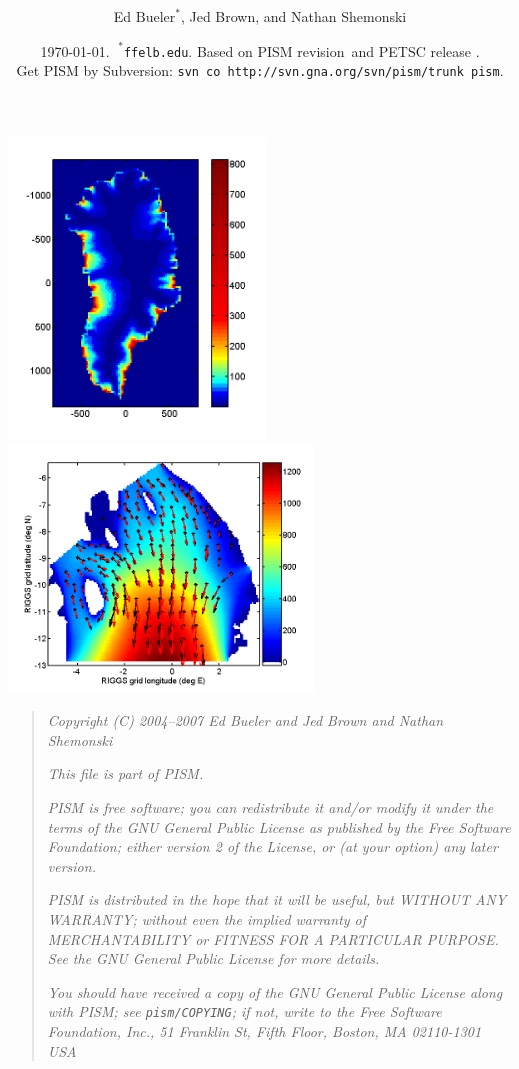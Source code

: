\documentclass[11pt,final]{amsart}
\title[PISM User's Manual]{\protect{\Large PISM, a \underline{P}arallel \underline{I}ce \underline{S}heet \underline{M}odel:\normalsize} \\ \protect{\Large \bigskip \bigskip User's Manual\normalsize}}
\author[]{Ed $\text{Bueler}^\ast$, Jed Brown, and Nathan Shemonski}
\date{\today.  $\phantom{|}^\ast$\texttt{ffelb\@@uaf.edu}.  Based on PISM revision \PISMREV\,and PETSC release \PETSCREV.  \\\tiny Get PISM by Subversion: \texttt{svn co http://svn.gna.org/svn/pism/trunk pism}.}
\newcommand{\normalspacing}{\renewcommand{\baselinestretch}{1.1}\tiny\normalsize}
\newcommand{\tablespacing}{\renewcommand{\baselinestretch}{1.0}\tiny\normalsize}
\begin{document}
\maketitle
\thispagestyle{empty}

\vspace{2.0in}
\begin{center}
\includegraphics[width=2.7in,keepaspectratio=true]{figs/greencbar_SSL2}\quad \includegraphics[width=3.2in,keepaspectratio=true]{figs/rossquiver}
\end{center}

\newpage
\phantom{bob}
\vspace{2in}
\begin{quote}
\textsl{Copyright (C) 2004--2007 Ed Bueler and Jed Brown and Nathan Shemonski}
\medskip

\noindent \textsl{This file is part of PISM.}
\medskip

\noindent \textsl{PISM is free software; you can redistribute it and/or modify it under the terms of the GNU General Public License as published by the Free Software Foundation; either version 2 of the License, or (at your option) any later version.}
\medskip

\noindent \textsl{PISM is distributed in the hope that it will be useful, but WITHOUT ANY WARRANTY; without even the implied warranty of MERCHANTABILITY or FITNESS FOR A PARTICULAR PURPOSE.  See the GNU General Public License for more details.}
\medskip

\noindent \textsl{You should have received a copy of the GNU General Public License along with PISM; see \emph{\texttt{pism/COPYING}}; if not, write to the Free Software Foundation, Inc., 51 Franklin St, Fifth Floor, Boston, MA  02110-1301 USA}
\end{quote}
\vspace{1in}
\normalspacing
\end{document}
